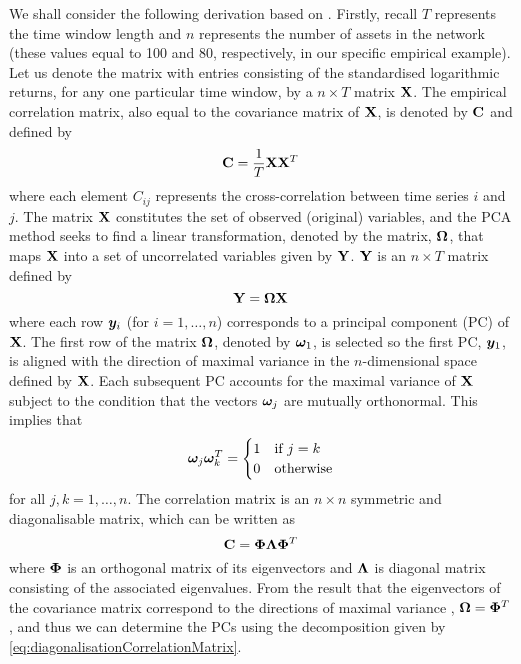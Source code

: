 We shall consider the following derivation based on \cite{Jol02,UIO03,FPM+10,FPW+11,Gil14}.
Firstly, recall $T$ represents the time window length and $n$ represents the number of assets in the network (these values equal to 100 and 80, respectively, in our specific empirical example).
Let us denote the matrix with entries consisting of the standardised logarithmic returns, for any one particular time window, by a $n \times T$ matrix $\mathbf X$.
The empirical correlation matrix, also equal to the covariance matrix of $\mathbf X$, is denoted by $\mathbf C$ and defined by
\begin{equation}
	\label{eq:correlationMatrix}
	\mathbf C = \frac{1}{T} \mathbf X \mathbf X^{T}
\end{equation}
where each element $C_{ij}$ represents the cross-correlation between time series $i$ and $j$.
The matrix $\mathbf X$ constitutes the set of observed (original) variables, and the PCA method seeks to find a linear transformation, denoted by the matrix, $\mathbf\Omega$, that maps $\mathbf X$ into a set of uncorrelated variables given by $\mathbf Y$.
$\mathbf Y$ is an $n \times T$ matrix defined by
\begin{equation}
	\label{eq:uncorrelatedVariables}
	\mathbf Y = \mathbf\Omega \mathbf X 
\end{equation}
where each row $\vecvar{y}_{i}$ (for $i =1,\dots,n$) corresponds to a principal component (PC) of $\mathbf X$.
The first row of the matrix $\mathbf\Omega$, denoted by $\vecvar{\omega}_{1}$, is selected so the first PC, $\vecvar{y}_{1}$, is aligned with the direction of maximal variance in the $n$-dimensional space defined by $\mathbf X$.
Each subsequent PC accounts for the maximal variance of $\mathbf X$ subject to the condition that the vectors $\vecvar{\omega}_{j}$ are mutually orthonormal.
This implies that
\begin{equation}
	\label{eq:PCCoefficients}
	 \vecvar{\omega}_{j} \transpose{\vecvar{\omega}_{k}} =
	\begin{cases}
		1 & \text{if } j = k\\
		0 & \text{otherwise}
	\end{cases}
\end{equation}
for all $j,k = 1,\dots,n$.
The correlation matrix is an $n \times n$ symmetric and diagonalisable matrix, which can be written as 
\begin{equation}
	\label{eq:diagonalisationCorrelationMatrix}
	\mathbf C = \mathbf\Phi \mathbf\Lambda \mathbf\Phi^{T}
\end{equation}
where $\mathbf\Phi$ is an orthogonal matrix of its eigenvectors and $\mathbf\Lambda$ is diagonal matrix consisting of the associated eigenvalues.
From the result that the eigenvectors of the covariance matrix correspond to the directions of maximal variance \cite{Jol02}, $\mathbf\Omega = \mathbf\Phi^{T}$, and thus we can determine the PCs using the decomposition given by \cref{eq:diagonalisationCorrelationMatrix}.

